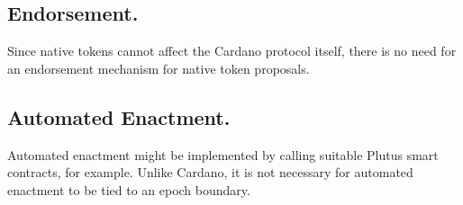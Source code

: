 \subsection{Endorsement.}

Since native tokens cannot affect the Cardano protocol itself, there is no need for an endorsement mechanism
for native token proposals.

\subsection{Automated Enactment.}

Automated enactment might be implemented by calling suitable Plutus smart contracts, for example.  Unlike
Cardano, it is not necessary for automated enactment to be tied to an epoch boundary.
